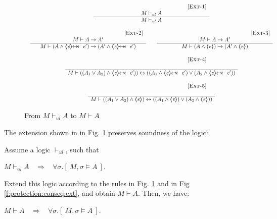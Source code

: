 \begin{figure}[htb]
$
\begin{array}{c}
\inferruleSD{[\sc{Ext-1}]}
	{  M \vdash_{ul} A  	}
	{ M \vdash_{ul} A   }
\\ \\
\begin{array}{lcl}
\inferruleSD{[\sc{Ext-2}]}
	{  
	M \vdash A \rightarrow A'
	 
	}
	{   M \vdash (A \wedge \protectedFrom {\re} {\re'}) \rightarrow (A' \wedge \protectedFrom {\re} {\re'})   }
& & 
\inferruleSD{[\sc{Ext-3}]}
	{   
	M \vdash A \rightarrow A'
	 
	}
	{   M \vdash (A \wedge \inside {\re} {) \rightarrow (A' \wedge \inside{\re}})   }
\end{array}
\\ \\
\inferruleSD{[\sc{Ext-4}]}
	{   
	\
	}
	{   M \vdash {((A_1 \vee A_2) \wedge \protectedFrom {\re} {\re'})) \leftrightarrow 
	                     ((A_1  \wedge  \protectedFrom {\re} {\re'})  \vee (A_2  \wedge \protectedFrom {\re} {\re'}))  }}
\\ \\
\inferruleSD{[\sc{Ext-5}]}
	{   \ 
	}
	{   M \vdash {((A_1 \vee A_2) \wedge \inside{\re}) \leftrightarrow 
	                     ((A_1  \wedge  \inside{\re})  \vee (A_2  \wedge  \inside{\re}))  }}
\end{array}
$
\caption{From $M \vdash_{ul} A$ to $M \vdash  A$}
\label{assert:logic:extend}
\end{figure}

\noindent
The extension shown in  in Fig.  \ref{assert:logic:extend}  preserves soundness of the logic:

\begin{lemma}
Assume a logic $\vdash_{ul}$, such that 
\begin{center}
$M \vdash_{ul} A   \ \ \ \  \Longrightarrow  \ \ \ \  \forall \sigma.[\ M, \sigma \models A\ ]$.\\
 \end{center}

\noindent
Extend this logic according to the rules in Fig.  \ref{assert:logic:extend} and in Fig \ref{f:protection:conseq:ext}, and obtain $M \vdash  A$. Then, we have:
\begin{center}
$M \vdash A   \ \ \ \  \Longrightarrow  \ \ \ \  \forall \sigma.[\ M, \sigma \models A\ ]$.\\
 \end{center}

\end{lemma}

